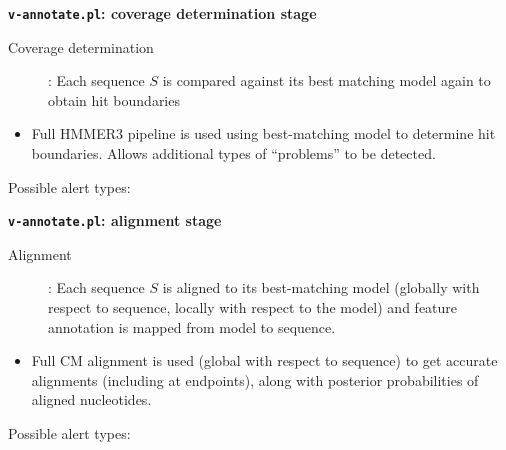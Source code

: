 \documentclass[landscape]{slides}
\begin{document}
\begin{slide}
\begin{center}
\textbf{\texttt{v-annotate.pl}: coverage determination stage}
\end{center}

\begin{description}
\item[Coverage determination]: Each sequence $S$ is compared against
  its best matching model again to obtain hit boundaries
\end{description}

\begin{itemize} 
\item Full HMMER3 pipeline is used using best-matching model to 
  determine hit boundaries. Allows additional types of ``problems'' to
  be detected. 
\end{itemize}

Possible alert types:

\vfill
\end{slide}
\begin{slide}
\begin{center}
\textbf{\texttt{v-annotate.pl}: alignment stage}
\end{center}

\begin{description}
\item[Alignment]: Each sequence $S$ is aligned to its best-matching
  model (globally with respect to sequence, locally with respect to
  the model) and feature annotation is mapped from model to sequence.
\end{description}

\begin{itemize} 
\item Full CM alignment is used (global with respect to sequence) to get
  accurate alignments (including at endpoints), along with posterior
  probabilities of aligned nucleotides.
\end{itemize}

Possible alert types:

\vfill
\end{slide}
\end{document}
